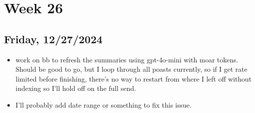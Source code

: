 \newpage
\section{Week 26}

\subsection{Friday, 12/27/2024}
\begin{itemize}
    \item work on bb to refresh the summaries using gpt-4o-mini with moar
        tokens. Should be good to go, but I loop through all poasts currently,
        so if I get rate limited before finishing, there's no way to restart
        from where I left off without indexing so I'll hold off on the full
        send.
    \item I'll probably add date range or something to fix this issue.
\end{itemize}
